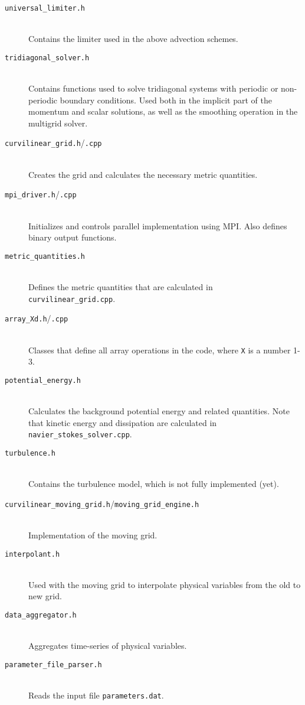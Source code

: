 \documentclass[12pt]{report}
\begin{document}
\begin{description}
\item[\texttt{universal\_limiter.h}] \hfill \\Contains the limiter used in the above advection schemes.
\item[\texttt{tridiagonal\_solver.h}] \hfill \\Contains functions used to solve tridiagonal systems with periodic or non-periodic boundary conditions. Used both in the implicit part of the momentum and scalar solutions, as well as the smoothing operation in the multigrid solver.
\item[\texttt{curvilinear\_grid.h}/\texttt{.cpp}] \hfill \\Creates the grid and calculates the necessary metric quantities.
\item[\texttt{mpi\_driver.h}/\texttt{.cpp}] \hfill \\Initializes and controls parallel implementation using MPI. Also defines binary output functions.
\item[\texttt{metric\_quantities.h}] \hfill \\Defines the metric quantities that are calculated in \texttt{curvilinear\_grid.cpp}.
\item[\texttt{array\_Xd.h}/\texttt{.cpp}] \hfill \\Classes that define all array operations in the code, where \texttt{X} is a number 1-3.
\item[\texttt{potential\_energy.h}] \hfill \\Calculates the background potential energy and related quantities. Note that kinetic energy and dissipation are calculated in \texttt{navier\_stokes\_solver.cpp}.
\item[\texttt{turbulence.h}] \hfill \\Contains the turbulence model, which is not fully implemented (yet).
\item[\texttt{curvilinear\_moving\_grid.h}/\texttt{moving\_grid\_engine.h}] \hfill \\Implementation of the moving grid.
\item[\texttt{interpolant.h}] \hfill \\Used with the moving grid to interpolate physical variables from the old to new grid.
\item[\texttt{data\_aggregator.h}] \hfill \\Aggregates time-series of physical variables.
\item[\texttt{parameter\_file\_parser.h}] \hfill \\Reads the input file \texttt{parameters.dat}.
\end{description}
\end{document}
